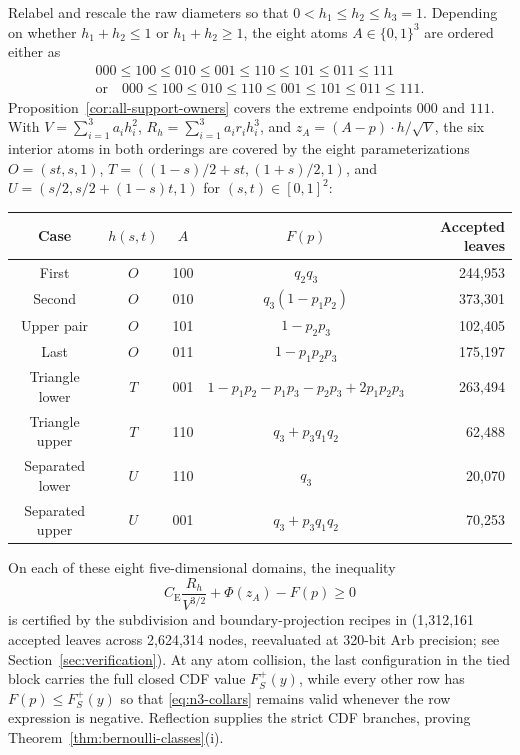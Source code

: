 \documentclass[11pt]{article}
\numberwithin{equation}{section}
\theoremstyle{definition}
\theoremstyle{remark}
\newcommand{\be}{C_{\mathrm E}}
\begin{document}
Relabel and rescale the raw diameters so that $0<h_1\le h_2\le h_3=1$. Depending
on whether $h_1+h_2\le1$ or $h_1+h_2\ge1$, the eight atoms $A\in\{0,1\}^3$
are ordered either as
\begin{gather*}
 000\le100\le010\le001\le110\le101\le011\le111\\
 \text{or}\quad
 000\le100\le010\le110\le001\le101\le011\le111.
\end{gather*}
Proposition~\ref{cor:all-support-owners} covers the extreme endpoints $000$
and $111$. With $V=\sum_{i=1}^3 a_ih_i^2$, $R_h=\sum_{i=1}^3 a_ir_ih_i^3$,
and $z_A=(A-p)\cdot h/\sqrt V$, the six interior atoms in both orderings are
covered by the eight parameterizations $O=(st,s,1)$,
$T=((1-s)/2+st,(1+s)/2,1)$, and $U=(s/2,s/2+(1-s)t,1)$ for $(s,t)\in[0,1]^2$:
\begin{center}
\begin{tabular}{ccccr}
\toprule
Case&$h(s,t)$&$A$&$F(p)$&Accepted leaves\\
\midrule
First &$O$&100&$q_2q_3$&244,953\\
Second &$O$&010&$q_3(1-p_1p_2)$&373,301\\
Upper pair &$O$&101&$1-p_2p_3$&102,405\\
Last &$O$&011&$1-p_1p_2p_3$&175,197\\
Triangle lower &$T$&001&$1-p_1p_2-p_1p_3-p_2p_3+2p_1p_2p_3$&263,494\\
Triangle upper &$T$&110&$q_3+p_3q_1q_2$&62,488\\
Separated lower &$U$&110&$q_3$&20,070\\
Separated upper &$U$&001&$q_3+p_3q_1q_2$&70,253\\
\bottomrule
\end{tabular}
\end{center}
On each of these eight five-dimensional domains, the inequality
\begin{equation}\label{eq:n3-certificate}
 \be \frac{R_h}{V^{3/2}}+\Phi(z_A)-F(p)\ge0
\end{equation}
is certified by the subdivision and boundary-projection recipes in
 (1,312,161 accepted leaves across
2,624,314 nodes, reevaluated at 320-bit Arb precision; see
Section~\ref{sec:verification}). At any atom collision, the last configuration
in the tied block carries the full closed CDF value $F_S^+(y)$, while every
other row has $F(p)\le F_S^+(y)$ so that \eqref{eq:n3-collars} remains valid
whenever the row expression is negative. Reflection supplies the strict CDF
branches, proving Theorem~\ref{thm:bernoulli-classes}(i).
\end{document}
